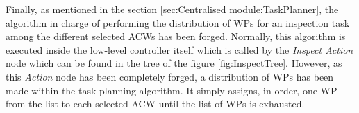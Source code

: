 Finally, as mentioned in the section \ref{sec:Centralised module:TaskPlanner}, the algorithm in charge of performing the distribution of \glspl{WP} for an inspection task among the different selected \glspl{ACW} has been forged. Normally, this algorithm is executed inside the low-level controller itself which is called by the \emph{Inspect Action} node which can be found in the tree of the figure \ref{fig:InspectTree}. However, as this \emph{Action} node has been completely forged, a distribution of \glspl{WP} has been made within the task planning algorithm. It simply assigns, in order, one \gls{WP} from the list to each selected \gls{ACW} until the list of \glspl{WP} is exhausted.